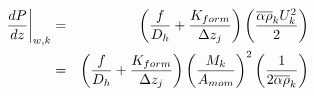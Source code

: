 \begin{eqnarray}
\frac{dP}{dz}\bigg\vert_{w,k} & = & \left(\frac{f}{D_h}+\frac{K_{form}}{\Delta z_j}\right)\left(\frac{\Ave{\alpha\rho}_k U^2_k}{2}\right)\\
& = & \left(\frac{f}{D_h}+\frac{K_{form}}{\Delta z_j}\right)\left(\frac{M_k}{A_{mom}}\right)^2\left(\frac{1}{2\Ave{\alpha\rho}_k}\right)
\end{eqnarray}